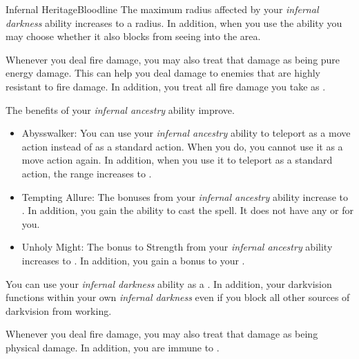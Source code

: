 \begin{feat}{Infernal Heritage}{Bloodline}
         The maximum radius affected by your \textit{infernal darkness} ability increases to a \arealarge radius.
        In addition, when you use the ability you may choose whether it also blocks  from seeing into the area.

         Whenever you deal fire damage, you may also treat that damage as being pure energy damage.
        This can help you deal damage to enemies that are highly resistant to fire damage.
        In addition, you treat all fire damage you take as .

         The benefits of your \textit{infernal ancestry} ability improve.
        \begin{itemize}
            \item Abysswalker: You can use your \textit{infernal ancestry} ability to teleport as a move action instead of as a standard action.
                When you do, you  cannot use it as a move action again.
                In addition, when you use it to teleport as a standard action, the range increases to \distrange.
            \item Tempting Allure: The bonuses from your \textit{infernal ancestry} ability increase to .
                In addition, you gain the ability to cast the  spell.
                It does not have any  or  for you.
            \item Unholy Might: The bonus to Strength from your \textit{infernal ancestry} ability increases to .
                In addition, you gain a  bonus to your .
        \end{itemize}

         You can use your \textit{infernal darkness} ability as a .
        In addition, your darkvision functions within your own \textit{infernal darkness} even if you block all other sources of darkvision from working.

         Whenever you deal fire damage, you may also treat that damage as being physical damage.
        In addition, you are immune to .


\end{feat}
